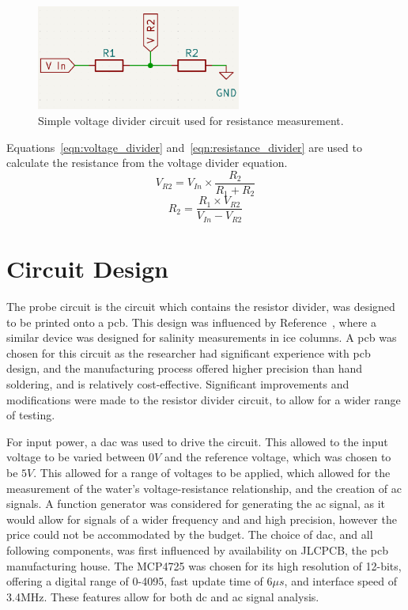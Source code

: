 \begin{figure}[H]\label{fig:voltage_divider}
    \centering
    \includegraphics[width=0.6\textwidth]{figures/fig_voltage_divider.png}
    \caption{Simple voltage divider circuit used for resistance measurement.}
    \label{fig:voltage_divider}
\end{figure}

Equations~\ref{eqn:voltage_divider} and~\ref{eqn:resistance_divider} are used to calculate the resistance from the voltage divider equation.
\begin{equation}\label{eqn:voltage_divider}
    V_{R2} = V_{In} \times \frac{R_2}{R_1 + R_2}
\end{equation}
\begin{equation}\label{eqn:resistance_divider}
    R_2 = \frac{R_1 \times V_{R2}}{V_{In}-V_{R2}}
\end{equation}


\section{Circuit Design}\label{sec:circuit_design}
The probe circuit is the circuit which contains the resistor divider, was designed to be printed onto a \gls{pcb}.
This design was influenced by Reference~\cite{cam_clark}, where a similar device was designed for salinity measurements in ice columns.
A \gls{pcb} was chosen for this circuit as the researcher had significant experience with \gls{pcb} design, and the manufacturing process offered higher precision than hand soldering, and is relatively cost-effective.
Significant improvements and modifications were made to the resistor divider circuit, to allow for a wider range of testing.

For input power, a \gls{dac} was used to drive the circuit. This allowed to the input voltage to be varied between $0 V$ and the reference voltage, which was chosen to be $5V$.
This allowed for a range of voltages to be applied, which allowed for the measurement of the water's voltage-resistance relationship, and the creation of \gls{ac} signals.
A function generator was considered for generating the \gls{ac} signal, as it would allow for signals of a wider frequency and and high precision, however the price could not be accommodated by the budget.
The choice of \gls{dac}, and all following components, was first influenced by availability on JLCPCB, the \gls{pcb} manufacturing house.
The MCP4725 was chosen for its high resolution of 12-bits, offering a digital range of 0-4095, fast update time of $6{\mu}s$, and interface speed of 3.4MHz.
These features allow for both \gls{dc} and \gls{ac} signal analysis.


